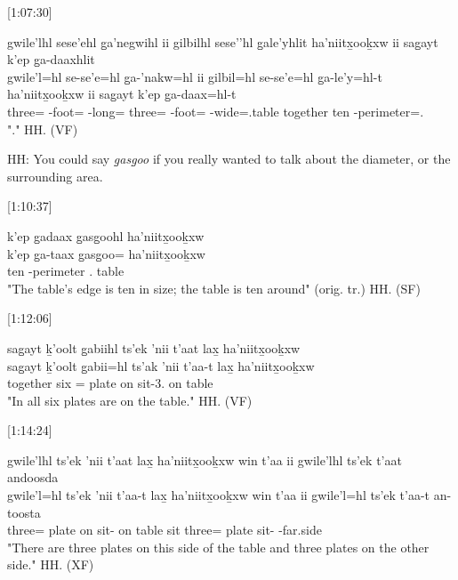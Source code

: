 [1:07:30]
\begin{exe}
    \ex \glll
    gwile’lhl sese’ehl g̱a’negwihl  ii gilbilhl sese'’hl g̱ale'yhlit ha'niitx̱ooḵxw ii sag̱ayt k’ep g̱a-daaxhlit \\
    gwile’l=hl se-se’e=hl g̱a-’nakw=hl  ii gilbil=hl se-se’e=hl g̱a-le'y=hl-t ha’niitx̱ooḵxw ii sag̱ayt k’ep g̱a-daax=hl-t \\
    three=\Cn{} \Pl-foot=\Cn{} \Distr-long=\Cn{} \Ccnj{} three=\Cn{} \Pl-foot=\Cn{} \Distr-wide=.\Ii table \Ccnj{} together ten \Distr-perimeter=.\Ii \\
    \glt "." \hfill HH.\ElicitationDate{} (VF)
\end{exe}

HH: You could say \textit{g̱asg̱oo} if you really wanted to talk about the diameter, or the surrounding area. 

[1:10:37]
\begin{exe}
    \ex \glll
    k’ep g̱adaax g̱asg̱oohl ha’niitx̱ooḵxw \\
    k’ep g̱a-taax g̱asg̱oo=\Cn{} ha’niitx̱ooḵxw \\
    ten \Distr-perimeter .\Ii{} table \\
    \glt "The table's edge is ten in size; the table is ten around"  (orig. tr.) \hfill HH.\ElicitationDate{} (SF)
\end{exe}

[1:12:06]
\begin{exe}
    \ex \glll
    sag̱ayt ḵ’oolt g̱abiihl ts’ek 'nii t'aat lax̱ ha’niitx̱ooḵxw  \\
    sag̱ayt ḵ’oolt g̱abii=hl ts’ak 'nii t'aa-t lax̱ ha’niitx̱ooḵxw  \\
    together six \Cnt=\Cn{} plate on sit-3.\Sx{} on table \\
    \glt "In all six plates are on the table." \hfill HH.\ElicitationDate{} (VF)
\end{exe}

[1:14:24]
\begin{exe}
    \ex \glll
    gwile'lhl ts’ek ’nii t’aat lax̱ ha’niitx̱ooḵxw win t’aa ii gwile’lhl ts’ek t’aat andoosda \\
    gwile'l=hl ts’ek ’nii t’aa-t lax̱ ha’niitx̱ooḵxw win t’aa ii gwile’l=hl ts’ek t’aa-t an-toosta \\
    three=\Cn{} plate on sit-\Sx{} on table \Comp{} sit \Ccnj{} three=\Cn{} plate sit-\Sx{} \Nmlz-far.side \\
    \glt "There are three plates on this side of the table and three plates on the other side." \hfill HH.\ElicitationDate{} (XF)
\end{exe}

